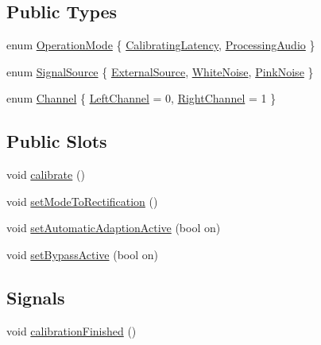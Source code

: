\subsection*{\-Public \-Types}
\begin{DoxyCompactItemize}
\item 
enum \hyperlink{classEarProcessor_a094f42adcbeee8e171a2527dae7d1256}{\-Operation\-Mode} \{ \hyperlink{classEarProcessor_a094f42adcbeee8e171a2527dae7d1256ae9788d433fd538e300653d96c7a16646}{\-Calibrating\-Latency}, 
\hyperlink{classEarProcessor_a094f42adcbeee8e171a2527dae7d1256a9630fd2816910eba9787853679c1d9fc}{\-Processing\-Audio}
 \}
\item 
enum \hyperlink{classEarProcessor_a4f53a396f0e0611b389c7c86456b5bcd}{\-Signal\-Source} \{ \hyperlink{classEarProcessor_a4f53a396f0e0611b389c7c86456b5bcda299de66bbce51b5337c1de3d4a88aa5a}{\-External\-Source}, 
\hyperlink{classEarProcessor_a4f53a396f0e0611b389c7c86456b5bcda3ecf45c3cb438ca5e53c4ab0135e2d51}{\-White\-Noise}, 
\hyperlink{classEarProcessor_a4f53a396f0e0611b389c7c86456b5bcda47712c41ea770f75eb0c37d095ded8d6}{\-Pink\-Noise}
 \}
\item 
enum \hyperlink{classEarProcessor_a3162fccb5c2a95e000acbfa19abaa540}{\-Channel} \{ \hyperlink{classEarProcessor_a3162fccb5c2a95e000acbfa19abaa540a924dc5ae5a38ef89c7bfff338bd0ec15}{\-Left\-Channel} =  0, 
\hyperlink{classEarProcessor_a3162fccb5c2a95e000acbfa19abaa540a2a1d3b7e6b44b65dc8a59dfcdf7607b3}{\-Right\-Channel} =  1
 \}
\end{DoxyCompactItemize}
\subsection*{\-Public \-Slots}
\begin{DoxyCompactItemize}
\item 
void \hyperlink{classEarProcessor_a326156f9aaf1b984964467cb2b42ac86}{calibrate} ()
\item 
void \hyperlink{classEarProcessor_a94090ceb7ae0ea2b1c41ff92afa3c843}{set\-Mode\-To\-Rectification} ()
\item 
void \hyperlink{classEarProcessor_a6687adc94ee3461ec22e00f7a3adba81}{set\-Automatic\-Adaption\-Active} (bool on)
\item 
void \hyperlink{classEarProcessor_a7e2eaf62f210cf0117f6fdf044aea89f}{set\-Bypass\-Active} (bool on)
\end{DoxyCompactItemize}
\subsection*{\-Signals}
\begin{DoxyCompactItemize}
\item 
void \hyperlink{classEarProcessor_ac3bc4f3ef240e7f4d020ea0ebe1f30f3}{calibration\-Finished} ()
\end{DoxyCompactItemize}
